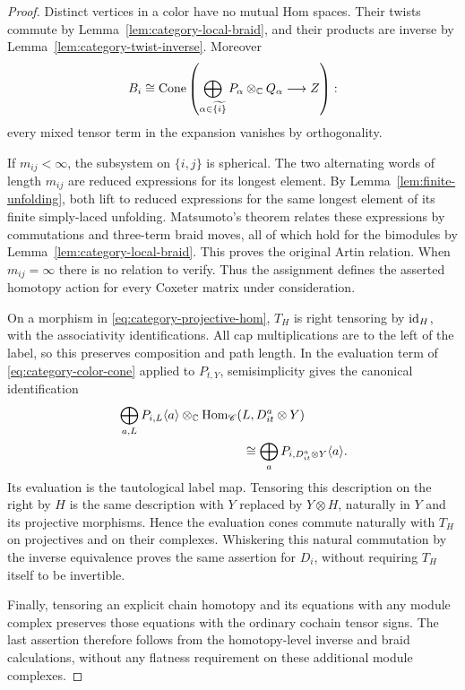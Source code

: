 \begin{proof}
Distinct vertices in a color have no mutual Hom spaces. Their twists
commute by Lemma~\ref{lem:category-local-braid}, and their products
are inverse by Lemma~\ref{lem:category-twist-inverse}. Moreover
\begin{equation}
 B_i\cong
 \operatorname{Cone}\left(\bigoplus_{\alpha\in\widetilde{\{i\}}}
               P_\alpha\otimes_\mathbb C Q_\alpha\longrightarrow Z\right):
 \label{eq:category-color-cone}
\end{equation}
every mixed tensor term in the expansion vanishes by orthogonality.

If $m_{ij}<\infty$, the subsystem on $\{i,j\}$ is spherical.
The two alternating words of length $m_{ij}$ are reduced expressions
for its longest element. By Lemma~\ref{lem:finite-unfolding}, both
lift to reduced expressions for the same longest element of its
finite simply-laced unfolding. Matsumoto's theorem relates these
expressions by commutations and three-term braid moves, all of which
hold for the bimodules by Lemma~\ref{lem:category-local-braid}.
This proves the original Artin relation. When $m_{ij}=\infty$ there
is no relation to verify. Thus the assignment defines the asserted
homotopy action for every Coxeter matrix under consideration.

On a morphism in \eqref{eq:category-projective-hom}, $T_H$ is
right tensoring by $\operatorname{id}_H$, with the associativity identifications.
All cap multiplications are to the left of the label, so this
preserves composition and path length. In the evaluation term of
\eqref{eq:category-color-cone} applied to $P_{t,Y}$, semisimplicity
gives the canonical identification
\begin{align*}
 &\bigoplus_{a,L}
    P_{i,L}\langle a\rangle\otimes_\C
      \Hom_{\mathscr C}(L,D^a_{it}\otimes Y)\\
 &\hspace{35mm}\cong
      \bigoplus_a P_{i,D^a_{it}\otimes Y}\langle a\rangle.
\end{align*}
Its evaluation is the tautological label map. Tensoring this
description on the right by $H$ is the same description with $Y$
replaced by $Y\otimes H$, naturally in $Y$ and its projective
morphisms. Hence the evaluation cones commute naturally with $T_H$
on projectives and on their complexes. Whiskering this natural
commutation by the inverse equivalence proves the same assertion
for $D_i$, without requiring $T_H$ itself to be invertible.

Finally, tensoring an explicit chain homotopy and its equations with
any module complex preserves those equations with the ordinary
cochain tensor signs. The last assertion therefore follows from
the homotopy-level inverse and braid calculations, without any
flatness requirement on these additional module complexes.
\end{proof}

